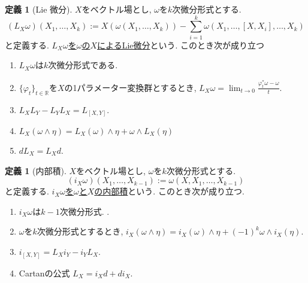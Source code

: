 \documentclass[dvipdfmx,a4paper,11pt]{article}
\newcommand{\R}{\mathbb{R}}
\theoremstyle{definition}
\newtheorem{dfn}[thm]{定義}
\begin{document}
  
      \begin{tcolorbox}[
    colback = white,
    colframe = green!35!black,
    fonttitle = \bfseries,
    breakable = true]
\begin{dfn}[Lie 微分]
$X$をベクトル場とし, $\omega$を$k$次微分形式とする.
$$
(L_{X}\omega) (X_1,\ldots, X_k):=X(\omega(X_1, \ldots, X_k)) - \sum_{i=1}^{k}\omega(X_1, \ldots, [X,X_i], \ldots, X_k)
$$
と定義する. \underline{$L_{X}\omega$を$\omega$の$X$によるLie微分}という. 
このとき次が成り立つ
\begin{enumerate}
 \setlength{\parskip}{0cm}
  \setlength{\itemsep}{2pt} 
\item $L_X \omega$は$k$次微分形式である. 
\item $\{ \varphi_{t} \}_{t \in \R}$を$X$の1パラメーター変換群とするとき, $L_{X} \omega = \lim_{t \rightarrow 0}\frac{\varphi^{*}_{t} \omega - \omega}{t}$. 
\item $L_{X}L_{Y} - L_{Y}L_{X}= L_{[X,Y]}$.
\item $L_{X}(\omega \wedge \eta )=L_{X}(\omega) \wedge \eta  + \omega \wedge L_{X}( \eta )$
\item $d L_{X} = L_{X}  d$.
\end{enumerate}
    \end{dfn}
    \end{tcolorbox}
    
  
  \begin{tcolorbox}[
    colback = white,
    colframe = green!35!black,
    fonttitle = \bfseries,
    breakable = true]
\begin{dfn}[内部積]
$X$をベクトル場とし, $\omega$を$k$次微分形式とする.
$$
(i_{X}\omega) (X_1,\ldots, X_{k-1}):=\omega(X, X_1, \ldots, X_{k-1}) 
$$
と定義する. \underline{$i_{X}\omega$を$\omega$と$X$の内部積}という. このとき次が成り立つ. 
\begin{enumerate}
 \setlength{\parskip}{0cm}
  \setlength{\itemsep}{2pt} 
\item $i_X \omega$は$k-1$次微分形式. . 
\item $\omega$を$k$次微分形式とするとき, $i_{X}(\omega \wedge \eta )=i_{X}(\omega) \wedge \eta  +(-1)^k \omega \wedge i_{X}( \eta )$. 
\item $i_{[X,Y]} = L_{X} i_{Y} - i_{Y} L_X$.
\item Cartanの公式 $L_X = i_{X}  d + d  i_{X} $. 
\end{enumerate}
    \end{dfn}
    \end{tcolorbox}
    
\end{document}
